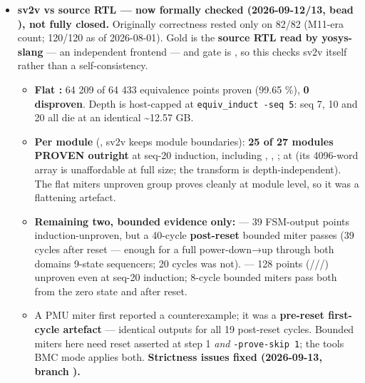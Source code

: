 \begin{record}

\begin{itemize}
\tightlist
\item
  \textbf{sv2v vs source RTL --- now formally checked
  (2026-09-12/\allowbreak{}13, bead ), not fully closed.}
  Originally correctness rested only on  82/82 (M11-era
  count; 120/120 as of 2026-08-01). Gold is the \textbf{source RTL read
  by yosys-slang} --- an independent frontend --- and gate is
  , so this checks sv2v itself rather than a
  self-consistency.

  \begin{itemize}
  \tightlist
  \item
    \textbf{Flat :} 64 209 of 64 433 equivalence points
    proven (99.65 \%), \textbf{0 disproven}. Depth is host-capped at
    \texttt{equiv\_\allowbreak{}induct\ -\allowbreak{}seq\ 5}: seq 7, 10
    and 20 all die at an identical \textasciitilde12.57 GB.
  \item
    \textbf{Per module} (, sv2v
    keeps module boundaries): \textbf{25 of 27 modules PROVEN outright}
    at seq-20 induction, including , ,
    ;  at 
    (its 4096-word array is unaffordable at full size; the transform is
    depth-independent). The flat miter\textquotesingle s unproven
     group proves cleanly at module level, so it was a
    flattening artefact.
  \item
    \textbf{Remaining two, bounded evidence only:}  --- 39
    FSM-output points induction-unproven, but a 40-cycle
    \textbf{post-reset} bounded miter passes (39 cycles after reset ---
    enough for a full power-down→up through both
    domains\textquotesingle{} 9-state sequencers; 20 cycles was not).
     --- 128 points
    (///)
    unproven even at seq-20 induction; 8-cycle bounded miters pass both
    from the zero state and after reset.
  \item
    A PMU miter first reported a counterexample; it was a
    \textbf{pre-reset first-cycle artefact} --- identical outputs for
    all 19 post-reset cycles. Bounded miters here need reset asserted at
    step 1 \emph{and} \texttt{-\allowbreak{}prove-\allowbreak{}skip\ 1};
    the tool\textquotesingle s BMC mode applies both. \textbf{Strictness
    issues fixed (2026-09-13, branch ).}

\end{itemize}
\end{itemize}
\end{record}
